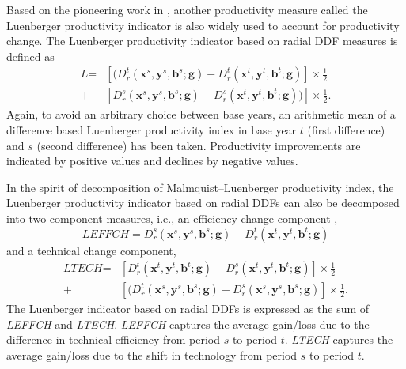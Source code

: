 Based on the pioneering work in \cite{Chambers2002}, another productivity measure called the Luenberger productivity indicator is also widely used to account for productivity change. 
The Luenberger productivity indicator based on radial DDF measures is defined as
\begin{equation}\begin{split}\label{eq_li_r}
    \textit{L} %
    = & \left[ (D _r^t({{\pmb{x}}^s},{{\pmb{y}}^s},{{\pmb{b}}^s};{\pmb{g}}) - D _r^t({{\pmb{x}}^t},{{\pmb{y}}^t},{{\pmb{b}}^t};{\pmb{g}}) \right] \times \frac{1}{2} \\ 
    + & \left[ D _r^s({{\pmb{x}}^s},{{\pmb{y}}^s},{{\pmb{b}}^s};{\pmb{g}}) - D _r^s({{\pmb{x}}^t},{{\pmb{y}}^t},{{\pmb{b}}^t};{\pmb{g}})) \right] \times \frac{1}{2}.
\end{split}\end{equation}
Again, to avoid an arbitrary choice between base years, an arithmetic mean of a difference based Luenberger productivity index in base year $t$ (first difference) and $s$ (second difference) has been taken. 
Productivity improvements are indicated by positive values and declines by negative values. 

In the spirit of decomposition of Malmquist–Luenberger productivity index, the Luenberger productivity indicator based on radial DDFs can also be decomposed into two component measures, i.e., an efficiency change component \citep{Mahlberg2011},
\begin{equation}
    \textit{LEFFCH} %
    = D _r^s({{\pmb{x}}^s},{{\pmb{y}}^s},{{\pmb{b}}^s};{\pmb{g}}) - D _r^t({{\pmb{x}}^t},{{\pmb{y}}^t},{{\pmb{b}}^t};{\pmb{g}})
\end{equation}
and a technical change component,
\begin{equation}\begin{split}
    \textit{LTECH} %
    = & \left[ D _r^t({{\pmb{x}}^t},{{\pmb{y}}^t},{{\pmb{b}}^t};{\pmb{g}}) - D _r^s({{\pmb{x}}^t},{{\pmb{y}}^t},{{\pmb{b}}^t};{\pmb{g}}) \right] \times \frac{1}{2} \\ 
    + & \left[ (D _r^t({{\pmb{x}}^s},{{\pmb{y}}^s},{{\pmb{b}}^s};{\pmb{g}}) - D _r^s({{\pmb{x}}^s},{{\pmb{y}}^s},{{\pmb{b}}^s};{\pmb{g}}) \right] \times \frac{1}{2}.
\end{split}\end{equation}
The Luenberger indicator based on radial DDFs is expressed as the sum of \textit{LEFFCH} and \textit{LTECH}. \textit{LEFFCH} captures the average gain/loss due to the difference in technical efficiency from period $s$ to period $t$. \textit{LTECH} captures the average gain/loss due to the shift in technology from period $s$ to period $t$.

